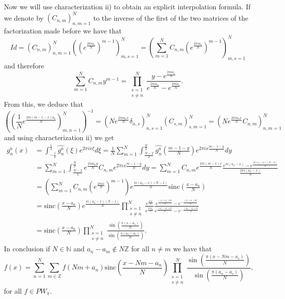 \documentclass[reqno]{amsart}
\theoremstyle{plain}
\theoremstyle{definition}
\numberwithin{equation}{section}
\newcommand{\Z}{{\mathbb Z}}
\newcommand{\N}{{\mathbb N}}
\newcommand{\pa}[1]{\left(#1\right)}
\newcommand{\sinc}{\mathrm{sinc}}
\begin{document}
Now we will use characterization ii) to obtain an explicit interpolation formula. If we denote by $\pa{C_{n,m}}_{n,m=1}^N$ to the inverse of the first of the two matrices of the factorization made before we have that
$$Id=\pa{C_{n,m}}_{n,m=1}^N \pa{\pa{e^\frac{2\pi i a_s}{N}}^{m-1}}_{m,s=1}^N
= \pa{\sum_{m=1}^N C_{n,m} \pa{e^\frac{2\pi i a_s}{N}}^{m-1}}_{m,s=1}^N$$
and therefore
$$\sum_{m=1}^N C_{n,m} y^{m-1}
=\prod_{\substack{s=1 \\ s\neq n}}^N \frac{y-e^\frac{2\pi i a_s}{N}}{e^\frac{2\pi i a_n}{N}-e^\frac{2\pi i a_s}{N}}.$$
From this, we deduce that
$$\pa{\pa{\frac{1}{N}e^{\frac{2\pi i(m-1-x)a_n}{N}}}_{m,n=1}^N}^{-1}
=\pa{N e^\frac{2\pi i a_n x}{N}\delta_{n,s}}_{n,s=1}^N \pa{C_{s,m}}_{s,m=1}^N
=\pa{N e^\frac{2\pi i a_n x}{N} C_{n,m}}_{n,m=1}^N$$
and using characterization ii) we get
\begin{align*}
	g^a_n(x) &=\int_{-\frac{1}{2}}^\frac{1}{2} \widehat{g^a_n}(\xi) e^{2\pi i x \xi} d\xi
	= \frac{1}{N} \sum_{m=1}^N \int_\frac{N-2}{2}^\frac{N}{2}  
	\widehat{g^a_n}\pa{\frac{m-1-y}{N}} e^{2\pi i x \frac{m-1-y}{N}} dy \\
	&= \sum_{m=1}^N \int_\frac{N-2}{2}^\frac{N}{2} e^\frac{2\pi i a_n y}{N} C_{n,m} e^{2\pi i x \frac{m-1-y}{N}} dy
	= \sum_{m=1}^N C_{n,m} e^\frac{2\pi i (m-1) x}{N} 
	\frac{e^{\pi i (a_n-x)}-e^\frac{\pi i (a_n-x) (N-2)}{N}}{\frac{2\pi i (a_n-x)}{N}} \\
	&= \pa{\sum_{m=1}^N C_{n,m} \pa{e^\frac{2\pi i x}{N}}^{m-1}} e^\frac{\pi i (a_n-x)(N-1)}{N} \sinc\pa{\frac{x-a_n}{N}} \\
    &= \sinc\pa{\frac{x-a_n}{N}} e^\frac{\pi i (a_n-x)(N-1)}{N}
    \prod_{\substack{s=1 \\ s\neq n}}^N \frac{e^\frac{\pi i x}{N}}{e^\frac{\pi i a_n}{N}}
    \frac{e^\frac{(x-a_s)\pi i}{N}-e^{-\frac{(x-a_s)\pi i}{N}}}{e^\frac{(a_n-a_s)\pi i}{N}-e^{-\frac{(a_n-a_s)\pi i}{N}}} \\
    &= \sinc\pa{\frac{x-a_n}{N}} \prod_{\substack{s=1 \\ s\neq n}}^N 
    \frac{\sin\pa{\frac{\pi(x-a_s)}{N}}}{\sin\pa{\frac{\pi(a_n-a_s)}{N}}}.
\end{align*}
In conclusion if $N\in\N$ and $a_n-a_m\notin N\Z$ for all $n\neq m$ we have that
$$f(x)=\sum_{n=1}^N \sum_{m\in\Z} f(Nm+a_n) \sinc\pa{\frac{x-Nm-a_n}{N}} \prod_{\substack{s=1 \\ s\neq n}}^N \frac{\sin\pa{\frac{\pi(x-Nm-a_s)}{N}}}{\sin\pa{\frac{\pi(a_n-a_s)}{N}}},$$
for all $f\in PW_\pi$.
\end{document}
